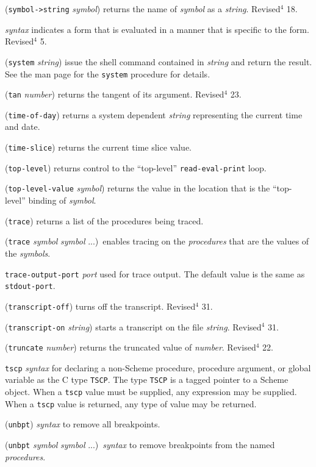 \documentclass[10pt,twocolumn]{article}
\begin{document}
(\texttt{symbol->string} \emph{symbol}) returns the name of \emph{symbol} as a
\emph{string}.  Revised$^4$ 18.

\emph{syntax} indicates a form that is evaluated in a manner that is
specific to the form.  Revised$^4$ 5.

(\texttt{system} \emph{string}) issue the shell command contained in \emph{string}
and return the result.  See the man page for the \texttt{system} procedure for 
details.

(\texttt{tan} \emph{number}) returns the tangent of its argument.
Revised$^4$ 23.

(\texttt{time-of-day}) returns a system dependent \emph{string}
representing the current time and date.

(\texttt{time-slice}) returns the current time slice value.

(\texttt{top-level}) returns control to the ``top-level'' \texttt{read-eval-print}
loop.

(\texttt{top-level-value} \emph{symbol}) returns the value in the location
that is the ``top-level'' binding of \emph{symbol}.

(\texttt{trace}) returns a list of the procedures being traced.

(\texttt{trace} \emph{symbol} \emph{symbol} ...)\ enables tracing on the
\emph{procedures} that are the values of the \emph{symbols}.

\texttt{trace-output-port} \emph{port} used for trace output. The default
value is the same as \texttt{stdout-port}.

(\texttt{transcript-off}) turns off the transcript.  Revised$^4$ 31.

(\texttt{transcript-on} \emph{string}) starts a transcript on the file
\emph{string}.  Revised$^4$ 31.

(\texttt{truncate} \emph{number}) returns the truncated value of \emph{number}.
Revised$^4$ 22.

\texttt{tscp} \emph{syntax} for declaring a non-Scheme procedure, procedure
argument, or global variable as the C type \texttt{TSCP}. The type
\texttt{TSCP} is a tagged pointer to a Scheme object. When a \texttt{tscp}
value must be supplied, any expression may be supplied.  When a
\texttt{tscp} value is returned, any type of value may be returned.

(\texttt{unbpt}) \emph{syntax} to remove all breakpoints.

(\texttt{unbpt} \emph{symbol} \emph{symbol} ...)\ \emph{syntax} to remove
breakpoints from the named \emph{procedures}.
\end{document}
